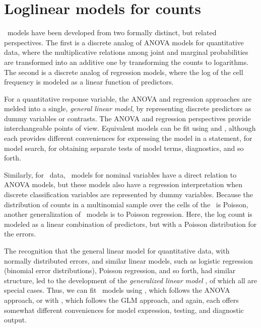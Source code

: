 \section{Loglinear models for counts}\label{sec:loglin-counts}

\Loglin\ models have been developed from two formally distinct,
but related perspectives.  The first is a discrete analog of ANOVA models
for quantitative data, where the multiplicative relations among joint and marginal probabilities are transformed into an additive one by transforming
the counts to logarithms.
The second is a discrete analog of regression models, where the log of the
cell frequency is modeled as a linear function of predictors.

For a quantitative response variable, the ANOVA and regression
approaches are melded into a single, \emph{general linear model},
by representing discrete predictors as dummy variables or contrasts.
The ANOVA and regression perspectives provide interchangeable points
of view.  Equivalent models can be fit using  and
, although each provides different conveniences for
expressing the model in a  statement, for model search,
for obtaining separate tests of model terms, diagnostics, and so
forth.

Similarly, for \ctab\ data, \loglin\ models for nominal variables
have a direct relation to ANOVA models, but these models also have
a regression interpretation when discrete classification variables
are represented by dummy variables.  Because the distribution of
counts in a multinomial sample over the cells of the \ctab\ is
Poisson, another generalization of \loglin\ models is to Poisson
regression.  Here,
the log count is modeled as a linear combination
of predictors, but with a Poisson distribution for the errors.

The recognition that the general linear model for quantitative data,
with normally distributed errors, and similar linear models, such as
logistic regression (binomial error distributions), Poisson regression,
and so forth, had similar structure, led to the development of the
\emph{generalized linear model} \citep{McCullaghNelder:89},
of which all are special cases.
Thus, we can fit \loglin\ models using , which
follows the ANOVA approach, or with , which
follows the GLM approach, and again, each offers somewhat different
conveniences for model expression, testing, and diagnostic output.

